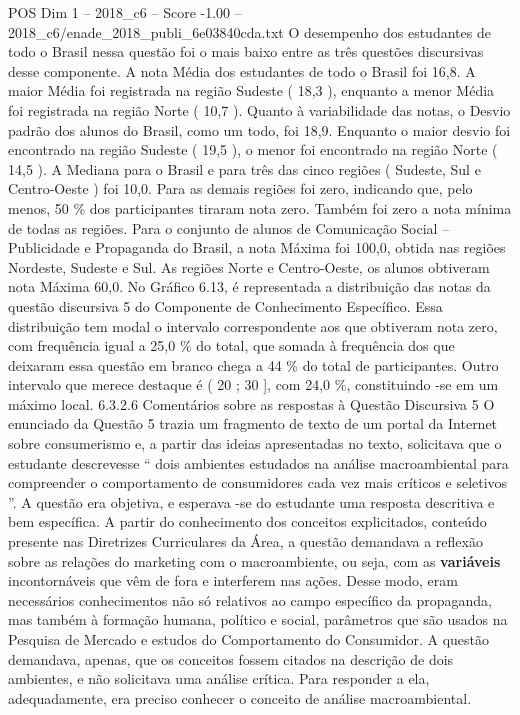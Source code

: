 \begin{textsample}{POS Dim 1 – 2018\_c6 – Score -1.00 – 2018\_c6/enade\_2018\_publi\_6e03840cda.txt}
O desempenho dos estudantes de todo o Brasil nessa questão foi o mais baixo entre as três questões discursivas desse componente.
A nota Média dos estudantes de todo o Brasil foi 16,8.
A maior Média foi registrada na região Sudeste ( 18,3 ), enquanto a menor Média foi registrada na região Norte ( 10,7 ).
Quanto à variabilidade das notas, o Desvio padrão dos alunos do Brasil, como um todo, foi 18,9.
Enquanto o maior desvio foi encontrado na região Sudeste ( 19,5 ), o menor foi encontrado na região Norte ( 14,5 ).
A Mediana para o Brasil e para três das cinco regiões ( Sudeste, Sul e Centro-Oeste ) foi 10,0.
Para as demais regiões foi zero, indicando que, pelo menos, 50 \% dos participantes tiraram nota zero.
Também foi zero a nota mínima de todas as regiões.
Para o conjunto de alunos de Comunicação Social – Publicidade e Propaganda do Brasil, a nota Máxima foi 100,0, obtida nas regiões Nordeste, Sudeste e Sul.
As regiões Norte e Centro-Oeste, os alunos obtiveram nota Máxima 60,0.
No Gráfico 6.13, é representada a distribuição das notas da questão discursiva 5 do Componente de Conhecimento Específico.
Essa distribuição tem modal o intervalo correspondente aos que obtiveram nota zero, com frequência igual a 25,0 \% do total, que somada à frequência dos que deixaram essa questão em branco chega a 44 \% do total de participantes.
Outro intervalo que merece destaque é ( 20 ; 30 ], com 24,0 \%, constituindo -se em um máximo local. 6.3.2.6 Comentários sobre as respostas à Questão Discursiva 5 O enunciado da Questão 5 trazia um fragmento de texto de um portal da Internet sobre consumerismo e, a partir das ideias apresentadas no texto, solicitava que o estudante descrevesse “ dois ambientes estudados na análise macroambiental para compreender o comportamento de consumidores cada vez mais críticos e seletivos ”.
A questão era objetiva, e esperava -se do estudante uma resposta descritiva e bem específica.
A partir do conhecimento dos conceitos explicitados, conteúdo presente nas Diretrizes Curriculares da Área, a questão demandava a reflexão sobre as relações do marketing com o macroambiente, ou seja, com as \textbf{variáveis} incontornáveis que vêm de fora e interferem nas ações.
Desse modo, eram necessários conhecimentos não só relativos ao campo específico da propaganda, mas também à formação humana, político e social, parâmetros que são usados na Pesquisa de Mercado e estudos do Comportamento do Consumidor.
A questão demandava, apenas, que os conceitos fossem citados na descrição de dois ambientes, e não solicitava uma análise crítica.
Para responder a ela, adequadamente, era preciso conhecer o conceito de análise macroambiental.

\end{textsample}
